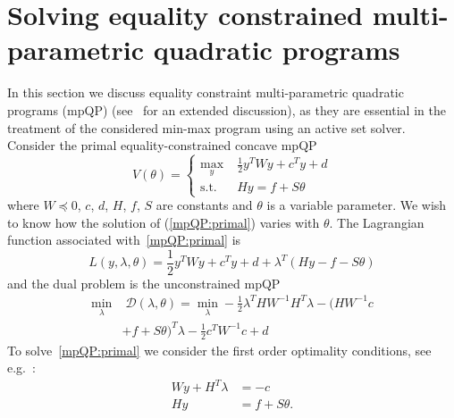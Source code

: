 \documentclass{ifacconf}
\begin{document}
\section{Solving equality constrained multi-parametric quadratic programs}\label{sec:gen:mpQP}
In this section we discuss equality constraint multi-parametric quadratic programs (mpQP) 
(see~\cite{bemporad02,Tondel:2003} for an extended discussion), as they are essential in the treatment 
of the considered min-max program using an active set solver. 
Consider the primal equality-constrained concave mpQP
\begin{equation}\label{mpQP:primal}
	V(\theta) = \left\{\begin{split}
	\max_{y} & \;\frac{1}{2} y^T W y + c^Ty + d\\
	\text{s.t.} &\; Hy  = f +S\theta
	\end{split}\right.
\end{equation}
where $W\preceq 0$, $c$, $d$, $H$, $f$, $S$ are constants and $\theta$ is a variable parameter. We wish to
know how the solution of (\ref{mpQP:primal}) varies with $\theta$.  The Lagrangian function
associated with~\eqref{mpQP:primal} is
\[
	L(y,\lambda,\theta)  = \frac{1}{2} y^T W y + c^Ty + d + \lambda^T(Hy - f - S\theta)
\]
and the dual problem is the unconstrained mpQP
\begin{equation}\label{mpQP:dual}\begin{split}
	\min_\lambda &\; \mathcal D(\lambda,\theta)= \min_\lambda-\frac{1}{2}\lambda^T H W^{-1}H^T \lambda 
	-(HW^{-1}c\\ &+ f + S\theta)^T\lambda
	-\frac{1}{2}c^TW^{-1}c +d
\end{split}\end{equation}
To solve~\eqref{mpQP:primal} we consider the first order optimality conditions, see e.g.~\cite{Fletcher:2000}:
\begin{equation}\label{kkt:conditions}
	\begin{aligned}
        W y + H^T\lambda & = -c \\
        H y &= f + S\theta.
	\end{aligned}
\end{equation}
\end{document}
